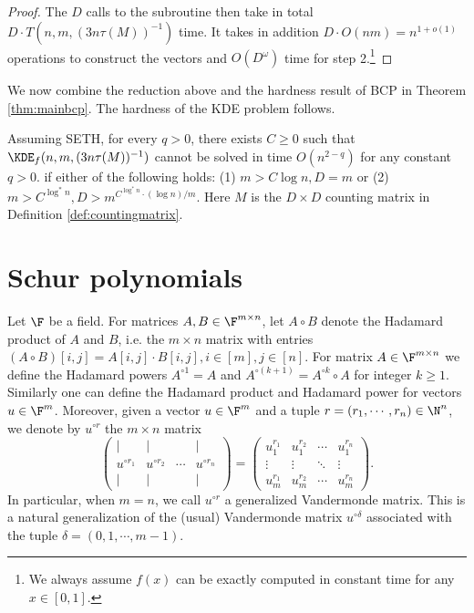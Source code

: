 \begin{proof}
The $D$ calls to the subroutine then take in total $D \cdot T(n, m, (3n\tau(M))^{-1})$ time. It takes in addition $D \cdot O(nm) = n^{1 + o(1)}$ operations to construct the vectors and $O(D^{\omega})$ time for step 2.\footnote{We always assume $f(x)$ can be exactly computed in constant time for any $x \in [0, 1]$.}
\end{proof}

We now combine the reduction above and the hardness result of BCP in Theorem \ref{thm:mainbcp}. The hardness of the KDE problem follows.
\begin{theorem} \label{thm:kdehardness}
Assuming SETH, for every $q > 0$, there exists $C \ge 0$ such that $\KDE_f(n, m, (3n\tau(M))^{-1})$
cannot be solved in time $O(n^{2-q})$ for any constant $q>0$. if either of the following holds: (1) $m > C \log n, D = m$ or (2) $m > C^{\log^* n}, D > m^{C^{\log^* n} \cdot (\log n)/m}$. Here $M$ is the $D \times D$ counting matrix in Definition \ref{def:countingmatrix}.
\end{theorem}

\section{Schur polynomials}
\label{sec:Schur}

Let $\F$ be a field. For matrices $A, B \in \F^{m \times n}$, let $A \circ B$ denote the Hadamard product of $A$ and $B$, i.e. the $m \times n$ matrix with entries $(A \circ B)[i, j] = A[i, j] \cdot B[i, j], i\in [m], j \in [n]$. For matrix $A \in \F^{m \times n}$ we define the Hadamard powers $A^{\circ 1} = A$ and $A^{\circ (k+1)} = A^{\circ k} \circ A$ for integer $k \ge 1$.
Similarly one can define the Hadamard product and Hadamard power for vectors $u \in \F^m$. Moreover, given a vector $u \in \F^m$ and a tuple $r = (r_1, \cdots, r_n) \in \N^{n}$,
we denote by $u^{\circ r}$ the $m \times n$ matrix
\[\begin{pmatrix}
| & | & & | \\
u^{\circ r_1} & u^{\circ r_2} & \cdots & u^{\circ r_n} \\
| & | & & |
\end{pmatrix}
=\begin{pmatrix}
u_1^{r_1} & u_1^{r_2} & \cdots & u_1^{r_n} \\
\vdots & \vdots & \ddots & \vdots \\
u_m^{r_1} & u_m^{r_2} & \cdots & u_m^{r_n}
\end{pmatrix}.\]
In particular, when $m = n$, we call $u^{\circ r}$ a generalized Vandermonde matrix. This is a natural generalization of the (usual) Vandermonde matrix $u^{\circ \delta}$ associated with the tuple $\delta = (0, 1, \cdots, m-1)$.

